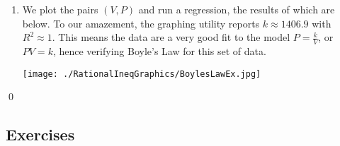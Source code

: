 \documentclass{ximera}
\begin{document}
\begin{example}
\begin{enumerate}
\item  We plot the pairs $(V, P)$ and run a regression, the results of which are below.  To our amazement, the graphing utility reports $k \approx 1406.9$ with  $R^2 \approx 1$.  This means the data are a very good fit to the model $P = \frac{k}{V}$, or $PV = k$, hence verifying Boyle's Law for this set of data.

\begin{center}

\texttt{[image: ./RationalIneqGraphics/BoylesLawEx.jpg]} 

\end{center}


\end{enumerate}
\qed

\end{example}

\newpage

\subsection{Exercises}


\closegraphsfile
\end{document}
